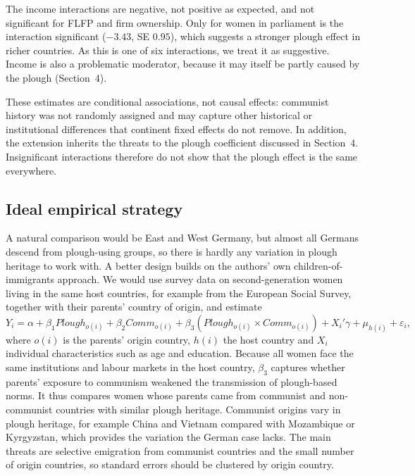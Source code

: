 \documentclass[12pt,a4paper]{article}
\begin{document}
The income interactions are negative, not positive as expected, and not significant for FLFP and firm ownership. Only for women in parliament is the interaction significant ($-3.43$, SE $0.95$), which suggests a stronger plough effect in richer countries. As this is one of six interactions, we treat it as suggestive. Income is also a problematic moderator, because it may itself be partly caused by the plough (Section~4).

These estimates are conditional associations, not causal effects: communist history was not randomly assigned and may capture other historical or institutional differences that continent fixed effects do not remove. In addition, the extension inherits the threats to the plough coefficient discussed in Section~4. Insignificant interactions therefore do not show that the plough effect is the same everywhere.

\subsection{Ideal empirical strategy}

A natural comparison would be East and West Germany, but almost all Germans descend from plough-using groups, so there is hardly any variation in plough heritage to work with. A better design builds on the authors' own children-of-immigrants approach. We would use survey data on second-generation women living in the same host countries, for example from the European Social Survey, together with their parents' country of origin, and estimate
\begin{equation}
    Y_{i} = \alpha + \beta_1 Plough_{o(i)} + \beta_2 Comm_{o(i)} + \beta_3 (Plough_{o(i)} \times Comm_{o(i)}) + X_i'\gamma + \mu_{h(i)} + \varepsilon_{i} ,
    \label{eq:ideal_strategy}
\end{equation}
where $o(i)$ is the parents' origin country, $h(i)$ the host country and $X_i$ individual characteristics such as age and education. Because all women face the same institutions and labour markets in the host country, $\beta_3$ captures whether parents' exposure to communism weakened the transmission of plough-based norms. It thus compares women whose parents came from communist and non-communist countries with similar plough heritage. Communist origins vary in plough heritage, for example China and Vietnam compared with Mozambique or Kyrgyzstan, which provides the variation the German case lacks. The main threats are selective emigration from communist countries and the small number of origin countries, so standard errors should be clustered by origin country.
\end{document}
